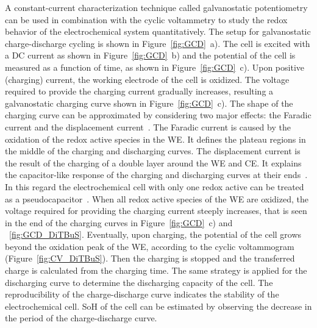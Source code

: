 A constant-current characterization technique called galvanostatic potentiometry~\cite{Bard_book} can be used in combination with the cyclic voltammetry to study the redox behavior of the electrochemical system quantitatively. The setup for galvanostatic charge-discharge cycling is shown in Figure~\ref{fig:GCD}~a). The cell is excited with a DC current as shown in Figure~\ref{fig:GCD}~b) and the potential of the cell is measured as a function of time, as shown in Figure~\ref{fig:GCD}~c). Upon positive (charging) current, the working electrode of the cell is oxidized. The voltage required to provide the charging current gradually increases, resulting a galvanostatic charging curve shown in Figure~\ref{fig:GCD}~c). The shape of the charging curve can be approximated by considering two major effects: the Faradic current and the displacement current~\cite{Bard_book}. The Faradic current is caused by the oxidation of the redox active species in the WE. It defines the plateau regions in the middle of the charging and discharging curves. The displacement current is the result of the charging of a double layer around the WE and CE. It explains the capacitor-like response of the charging and discharging curves at their ends~\cite{Bard_book}. In this regard the electrochemical cell with only one redox active can be treated as a pseudocapacitor~\cite{He_2022,Vereshchagin2022}. When all redox active species of the WE are oxidized, the voltage required for providing the charging current steeply increases, that is seen in the end of the charging curves in Figure~\ref{fig:GCD}~c) and ~\ref{fig:GCD_DiTBuS}. Eventually, upon charging, the potential of the cell grows beyond the oxidation peak of the WE, according to the cyclic voltammogram (Figure~\ref{fig:CV_DiTBuS}). Then the charging is stopped and the transferred charge is calculated from the charging time. The same strategy is applied for the discharging curve to determine the discharging capacity of the cell. The reproducibility of the charge-discharge curve indicates the stability of the electrochemical cell. SoH of the cell can be estimated by observing the decrease in the period of the charge-discharge curve.

